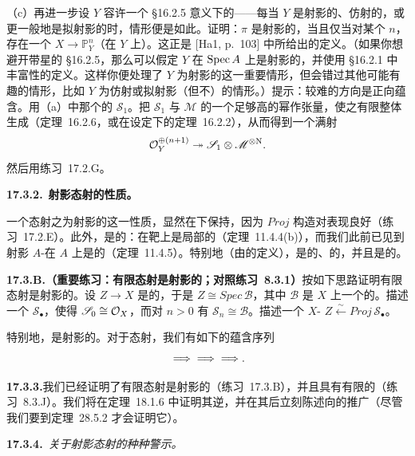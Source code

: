 （c）再进一步设 $Y$ 容许一个 \S16.2.5 意义下的\trAmple\trLineBundle——每当 $Y$ 是射影的、仿射的，或更一般地是拟射影的时，情形便是如此。证明：$\pi$ 是射影的，当且仅当对某个 $n$，存在一个\trClosedEmbedding{} $X\to\mathbb{P}^n_Y$（在 $Y$ 上）。这正是 [Ha1, p.~103] 中所给出的\trProjective\trMorphism{}定义。（如果你想避开带星的 \S16.2.5，那么可以假定 $Y$ 在 $\operatorname{Spec} A$ 上是射影的，并使用 \S16.2.1 中丰富性的定义。这样你便处理了 $Y$ 为射影的这一重要情形，但会错过其他可能有趣的情形，比如 $Y$ 为仿射或拟射影（但不\trProper）的情形。）提示：较难的方向是正向蕴含。用（a）中那个\trFiniteType{}的\trQCSheaf{} $\mathscr{S}_1$。把 $\mathscr{S}_1$ 与 $\mathscr{M}$ 的一个足够高的幂作张量，使之有限整体生成（\mbox{定理~16.2.6}，或在\trProper{}设定下的\mbox{定理~16.2.2}），从而得到一个满射
\[
\mathcal{O}_Y^{\oplus(n+1)}\twoheadrightarrow\mathscr{S}_1\otimes\mathscr{M}^{\otimes\mathrm{N}}.
\]
然后用\mbox{练习~17.2.G}。

\textbf{17.3.2.}\ \textbf{射影态射的性质。}

一个态射之为射影的这一性质，显然在\trBaseChange{}下保持，因为 $\mathit{Proj}$ 构造对\trBaseChange{}表现良好（\mbox{练习~17.2.E}）。此外，\trProjective\trMorphism{}是\trProper{}的：\trProperness{}在靶上是局部的（\mbox{定理~11.4.4}(b)），而我们此前已见到射影 $A$-\trScheme{}在 $A$ 上是\trProper{}的（\mbox{定理~11.4.5}）。特别地（由\trProperness{}的定义），\trProjective\trMorphism{}是\trSeparated{}的、\trFiniteType{}的，并且是\trUniversallyClosed{}的。

\textbf{17.3.B.（重要练习：有限态射是射影的；对照\mbox{练习~8.3.1}）}\quad 按如下思路证明有限态射是射影的。设 $Z\to X$ 是\trFinite{}的，于是 $Z\cong\mathit{Spec}\,\mathscr{B}$，其中 $\mathscr{B}$ 是 $X$ 上一个\trFiniteType{}的\trQC{}\trSheafOfAlgebras。描述一个\trSheafOfGradedAlgebras{} $\mathscr{S}_\bullet$，使得 $\mathscr{S}_0\cong\mathcal{O}_X$，而对 $n>0$ 有 $\mathscr{S}_n\cong\mathscr{B}$。描述一个 $X$-\trIsomorphism{} $Z\overset{\sim}{\longleftarrow}\mathit{Proj}\,\mathscr{S}_\bullet$。

特别地，\trClosedEmbedding{}是射影的。对于态射，我们有如下的蕴含序列
\[
\text{\trClosedEmbedding}\Longrightarrow\text{\trFinite}\Longrightarrow\text{\trProjective}\Longrightarrow\text{\trProper}.
\]

\textbf{17.3.3.}\quad 我们已经证明了有限态射是射影的（\mbox{练习~17.3.B}），并且具有有限的\trFiber（\mbox{练习~8.3.J}）。我们将在\mbox{定理~18.1.6} 中证明其逆，并在其后立刻陈述向\trProper\trMorphism{}的推广（尽管我们要到\mbox{定理~28.5.2} 才会证明它）。

\textbf{17.3.4.}\ \emph{关于射影态射的种种警示。}

